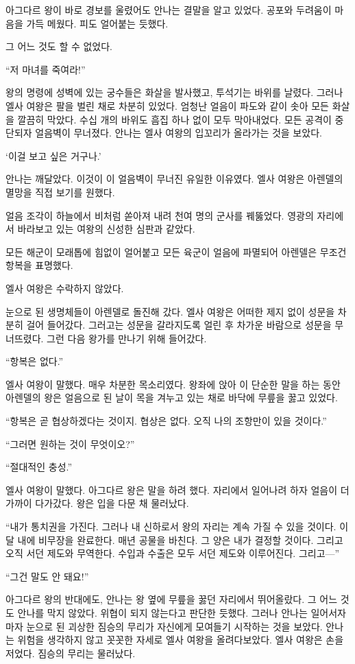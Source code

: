 아그다르 왕이 바로 경보를 울렸어도 안나는 결말을 알고 있었다. 공포와 두려움이 마음을 가득 메웠다. 피도 얼어붙는 듯했다.

그 어느 것도 할 수 없었다.

``저 마녀를 죽여라!''

왕의 명령에 성벽에 있는 궁수들은 화살을 발사했고, 투석기는 바위를 날렸다. 그러나 엘사 여왕은 팔을 벌린 채로 차분히 있었다. 엄청난 얼음이 파도와 같이 솟아 모든 화살을 깔끔히 막았다. 수십 개의 바위도 흠집 하나 없이 모두 막아내었다. 모든 공격이 중단되자 얼음벽이 무너졌다. 안나는 엘사 여왕의 입꼬리가 올라가는 것을 보았다.

`이걸 보고 싶은 거구나.'

안나는 깨달았다. 이것이 이 얼음벽이 무너진 유일한 이유였다. 엘사 여왕은 아렌델의 멸망을 직접 보기를 원했다.

얼음 조각이 하늘에서 비처럼 쏟아져 내려 천여 명의 군사를 꿰뚫었다. 영광의 자리에서 바라보고 있는 여왕의 신성한 심판과 같았다.

\textbreak

모든 해군이 모래톱에 힘없이 얼어붙고 모든 육군이 얼음에 파멸되어 아렌델은 무조건 항복을 표명했다.

엘사 여왕은 수락하지 않았다.

눈으로 된 생명체들이 아렌델로 돌진해 갔다. 엘사 여왕은 어떠한 제지 없이 성문을 차분히 걸어 들어갔다. 그러고는 성문을 갈라지도록 얼린 후 차가운 바람으로 성문을 무너뜨렸다. 그런 다음 왕가를 만나기 위해 들어갔다.

``항복은 없다.''

엘사 여왕이 말했다. 매우 차분한 목소리였다. 왕좌에 앉아 이 단순한 말을 하는 동안 아렌델의 왕은 얼음으로 된 날이 목을 겨누고 있는 채로 바닥에 무릎을 꿇고 있었다.

``항복은 곧 협상하겠다는 것이지. 협상은 없다. 오직 나의 조항만이 있을 것이다.''

``그러면 원하는 것이 무엇이오?''

``절대적인 충성.''

엘사 여왕이 말했다. 아그다르 왕은 말을 하려 했다. 자리에서 일어나려 하자 얼음이 더 가까이 다가갔다. 왕은 입을 다문 채 물러났다.

``내가 통치권을 가진다. 그러나 내 신하로서 왕의 자리는 계속 가질 수 있을 것이다. 이 달 내에 비무장을 완료한다. 매년 공물을 바친다. 그 양은 내가 결정할 것이다. 그리고 오직 서던 제도와 무역한다. 수입과 수출은 모두 서던 제도와 이루어진다. 그리고—''

``그건 말도 안 돼요!''

아그다르 왕의 반대에도, 안나는 왕 옆에 무릎을 꿇던 자리에서 뛰어올랐다. 그 어느 것도 안나를 막지 않았다. 위협이 되지 않는다고 판단한 듯했다. 그러나 안나는 일어서자마자 눈으로 된 괴상한 짐승의 무리가 자신에게 모여들기 시작하는 것을 보았다. 안나는 위험을 생각하지 않고 꼿꼿한 자세로 엘사 여왕을 올려다보았다. 엘사 여왕은 손을 저었다. 짐승의 무리는 물러났다.

